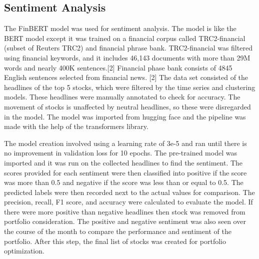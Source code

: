 \documentclass[12pt,a4paper, twoside]{article}
\begin{document}
\begin{multicols}{2}
\subsection{Sentiment Analysis}
    The FinBERT model was used for sentiment analysis. The model is like the BERT model except it was trained on a financial corpus called TRC2-financial (subset of Reuters TRC2) and financial phrase bank. TRC2-financial was filtered using financial keywords, and it includes 46,143 documents with more than 29M words and nearly 400K sentences.[2] Financial phase bank consists of 4845 English sentences selected from financial news. [2] The data set consisted of the headlines of the top 5 stocks, which were filtered by the time series and clustering models. These headlines were manually annotated to check for accuracy. The movement of stocks is unaffected by neutral headlines, so these were disregarded in the model. The model was imported from hugging face and the pipeline was made with the help of the transformers library.
     
    The model creation involved using a learning rate of 3e-5 and ran until there is no improvement in validation loss for 10 epochs. The pre-trained model was imported and it was run on the collected headlines to find the sentiment. The scores provided for each sentiment were then classified into positive if the score was more than 0.5 and negative if the score was less than or equal to 0.5. The predicted labels were then recorded next to the actual values for comparison. The precision, recall, F1 score, and accuracy were calculated to evaluate the model. If there were more positive than negative headlines then stock was removed from portfolio consideration. The positive and negative sentiment was also seen over the course of the month to compare the performance and sentiment of the portfolio. After this step, the final list of stocks was created for portfolio optimization.

\end{multicols}
\end{document}
